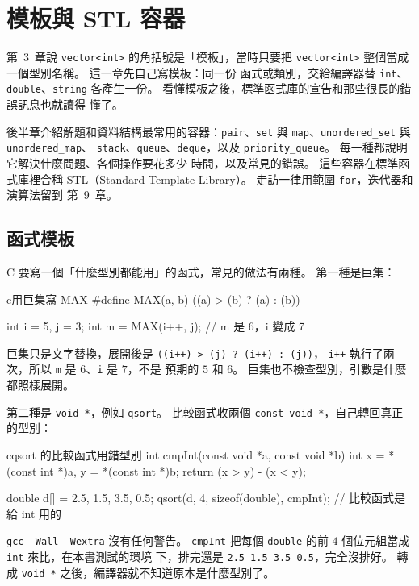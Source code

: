 \chapter{模板與 STL 容器}
\label{ch:templates-stl}

第~3~章說 \texttt{vector<int>} 的角括號是「模板」，當時只要把
\texttt{vector<int>} 整個當成一個型別名稱。 這一章先自己寫模板：同一份
函式或類別，交給編譯器替 \texttt{int}、\texttt{double}、\texttt{string}
各產生一份。 看懂模板之後，標準函式庫的宣告和那些很長的錯誤訊息也就讀得
懂了。

後半章介紹解題和資料結構最常用的容器：\texttt{pair}、\texttt{set} 與
\texttt{map}、\texttt{unordered\_set} 與 \texttt{unordered\_map}、
\texttt{stack}、\texttt{queue}、\texttt{deque}，以及
\texttt{priority\_queue}。 每一種都說明它解決什麼問題、各個操作要花多少
時間，以及常見的錯誤。 這些容器在標準函式庫裡合稱 STL（Standard
Template Library）。 走訪一律用範圍 \texttt{for}，迭代器和演算法留到
第~9~章。

\section{函式模板}
\label{sec:func-template}

\begin{crecap}
C 要寫一個「什麼型別都能用」的函式，常見的做法有兩種。 第一種是巨集：

\begin{code}{c}{用巨集寫 MAX}
#define MAX(a, b) ((a) > (b) ? (a) : (b))

int i = 5, j = 3;
int m = MAX(i++, j);       // m 是 6，i 變成 7
\end{code}

巨集只是文字替換，展開後是 \texttt{((i++) > (j) ? (i++) : (j))}，
\texttt{i++} 執行了兩次，所以 \texttt{m} 是 $6$、\texttt{i} 是 $7$，不是
預期的 $5$ 和 $6$。 巨集也不檢查型別，引數是什麼都照樣展開。

第二種是 \texttt{void *}，例如 \texttt{qsort}。 比較函式收兩個
\texttt{const void *}，自己轉回真正的型別：

\begin{code}{c}{qsort 的比較函式用錯型別}
int cmpInt(const void *a, const void *b) {
    int x = *(const int *)a, y = *(const int *)b;
    return (x > y) - (x < y);
}

double d[] = {2.5, 1.5, 3.5, 0.5};
qsort(d, 4, sizeof(double), cmpInt);   // 比較函式是給 int 用的
\end{code}

\texttt{gcc -Wall -Wextra} 沒有任何警告。 \texttt{cmpInt} 把每個
\texttt{double} 的前 $4$ 個位元組當成 \texttt{int} 來比，在本書測試的環境
下，排完還是 \texttt{2.5 1.5 3.5 0.5}，完全沒排好。 轉成 \texttt{void *}
之後，編譯器就不知道原本是什麼型別了。
\end{crecap}


